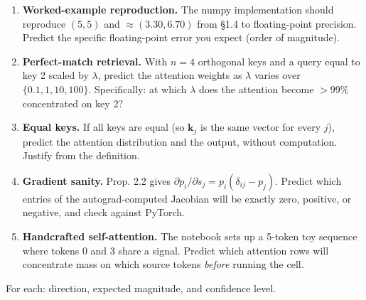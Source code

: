 \documentclass[
]{article}
\providecommand{\tightlist}{%
  \setlength{\itemsep}{0pt}\setlength{\parskip}{0pt}}
\begin{document}
\begin{enumerate}
\def\labelenumi{\arabic{enumi}.}
\tightlist
\item
  \textbf{Worked-example reproduction.} The numpy implementation should
  reproduce \((5, 5)\) and \(\approx (3.30, 6.70)\) from §1.4 to
  floating-point precision. Predict the specific floating-point error
  you expect (order of magnitude).
\item
  \textbf{Perfect-match retrieval.} With \(n = 4\) orthogonal keys and a
  query equal to key 2 scaled by \(\lambda\), predict the attention
  weights as \(\lambda\) varies over \(\{0.1, 1, 10, 100\}\).
  Specifically: at which \(\lambda\) does the attention become
  \(> 99\%\) concentrated on key 2?
\item
  \textbf{Equal keys.} If all keys are equal (so \(\mathbf{k}_j\) is the
  same vector for every \(j\)), predict the attention distribution and
  the output, without computation. Justify from the definition.
\item
  \textbf{Gradient sanity.} Prop. 2.2 gives
  \(\partial p_i / \partial s_j = p_i(\delta_{ij} - p_j)\). Predict
  which entries of the autograd-computed Jacobian will be exactly zero,
  positive, or negative, and check against PyTorch.
\item
  \textbf{Handcrafted self-attention.} The notebook sets up a 5-token
  toy sequence where tokens 0 and 3 share a signal. Predict which
  attention rows will concentrate mass on which source tokens
  \emph{before} running the cell.
\end{enumerate}

For each: direction, expected magnitude, and confidence level.
\end{document}
